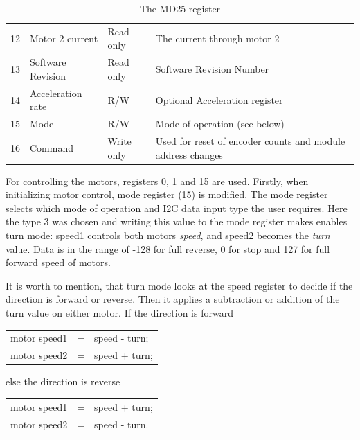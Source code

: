 \documentclass[11pt]{article}
\begin{document}
\begin{table}[h]
\begin{tabular}{@{}llll@{}}
		12                & Motor 2 current   & Read only           & The current through motor 2                                      \\
		13                & Software Revision & Read only           & Software Revision Number                                         \\
		14                & Acceleration rate & R/W                 & Optional Acceleration register                                   \\
		15                & Mode              & R/W                 & Mode of operation (see below)                                    \\
		16                & Command           & Write only          & Used for reset of encoder counts and module address changes      \\ \bottomrule
	\end{tabular}
	\caption{The MD25 register}
\end{table}

For controlling the motors, registers 0, 1 and 15 are used. Firstly, when initializing motor control, mode register (15) is modified.
The mode register selects which mode of operation and I2C data input type the user requires. Here the type 3 was chosen and writing this value 
to the mode register makes enables turn mode: speed1 controls both motors \textit{speed}, and speed2 becomes the \textit{turn} value. 
Data is in the range of -128 for full reverse, 0 for stop and 127 for full forward speed of motors.

It is worth to mention, that turn mode looks at the speed register to decide if the direction is forward or reverse. Then it applies a subtraction or addition of the turn value on either motor. If the direction is forward
\begin{table}[!ht]
	\centering
	\begin{tabular}{lcl}
		motor speed1 & = & speed - turn;\\
		motor speed2 & = & speed + turn;
	\end{tabular}
\end{table}

else the direction is reverse 
\begin{table}[!ht]
	\centering
	\begin{tabular}{lcl}
		motor speed1 & = & speed + turn;\\
		motor speed2 & = & speed - turn.
	\end{tabular}
\end{table}
\end{document}
